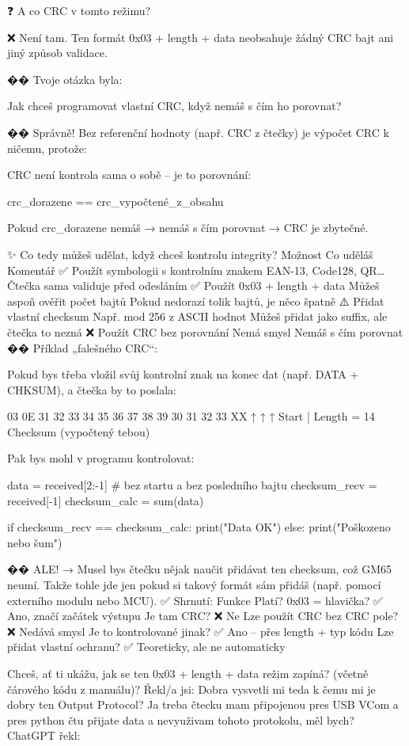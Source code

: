 ❓ A co CRC v tomto režimu?

    ❌ Není tam.
    Ten formát 0x03 + length + data neobsahuje žádný CRC bajt ani jiný způsob validace.

�� Tvoje otázka byla:

    Jak chceš programovat vlastní CRC, když nemáš s čím ho porovnat?

�� Správně! Bez referenční hodnoty (např. CRC z čtečky) je výpočet CRC k ničemu, protože:

    CRC není kontrola sama o sobě – je to porovnání:

    crc_dorazene == crc_vypočtené_z_obsahu

    Pokud crc_dorazene nemáš → nemáš s čím porovnat → CRC je zbytečné.

✨ Co tedy můžeš udělat, když chceš kontrolu integrity?
Možnost	Co uděláš	Komentář
✅ Použít symbologii s kontrolním znakem	EAN-13, Code128, QR…	Čtečka sama validuje před odesláním
✅ Použít 0x03 + length + data	Můžeš aspoň ověřit počet bajtů	Pokud nedorazí tolik bajtů, je něco špatně
⚠️ Přidat vlastní checksum	Např. mod 256 z ASCII hodnot	Můžeš přidat jako suffix, ale čtečka to nezná
❌ Použít CRC bez porovnání	Nemá smysl	Nemáš s čím porovnat
�� Příklad „falešného CRC“:

Pokud bys třeba vložil svůj kontrolní znak na konec dat (např. DATA + CHKSUM), a čtečka by to poslala:

03 0E 31 32 33 34 35 36 37 38 39 30 31 32 33 XX
↑ ↑                                      ↑
Start | Length = 14                      Checksum (vypočtený tebou)

Pak bys mohl v programu kontrolovat:

data = received[2:-1]  # bez startu a bez posledního bajtu
checksum_recv = received[-1]
checksum_calc = sum(data) %

if checksum_recv == checksum_calc:
    print("Data OK")
else:
    print("Poškozeno nebo šum")

�� ALE! → Musel bys čtečku nějak naučit přidávat ten checksum, což GM65 neumí.
Takže tohle jde jen pokud si takový formát sám přidáš (např. pomocí externího modulu nebo MCU).
✅ Shrnutí:
Funkce	Platí?
0x03 = hlavička?	✅ Ano, značí začátek výstupu
Je tam CRC?	❌ Ne
Lze použít CRC bez CRC pole?	❌ Nedává smysl
Je to kontrolované jinak?	✅ Ano – přes length + typ kódu
Lze přidat vlastní ochranu?	✅ Teoreticky, ale ne automaticky

Chceš, ať ti ukážu, jak se ten 0x03 + length + data režim zapíná? (včetně čárového kódu z manuálu)?
Řekl/a jsi:
Dobra vysvetli mi teda k čemu mi je dobry ten Output Protocol? Ja treba čtecku mam připojenou pres USB VCom a pres python čtu přijate data a nevyuživam tohoto protokolu, měl bych?
ChatGPT řekl:

